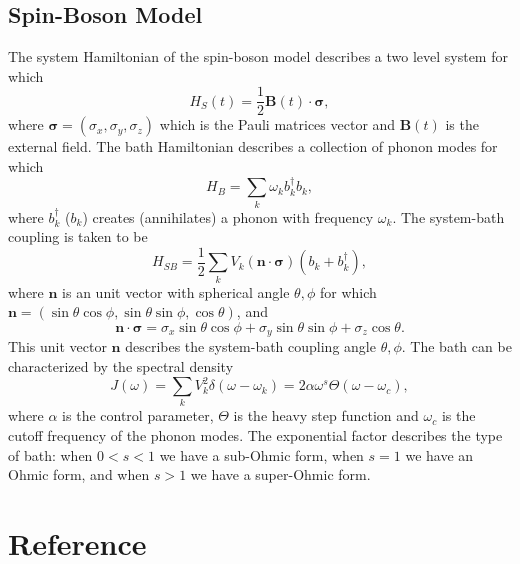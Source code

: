 \documentclass[11pt]{book}
\begin{document}
\section{Spin-Boson Model}
\label{sec:orgc525a9e}
The system Hamiltonian of the spin-boson model describes a two level
system for which
\begin{equation}
H_S(t)=\frac{1}{2}\bm{B}(t)\cdot\bm{\sigma},
\end{equation}
where \(\bm{\sigma}=(\sigma_x,\sigma_y,\sigma_z)\) which is the Pauli
matrices vector and \(\bm{B}(t)\) is the external field. The bath
Hamiltonian describes a collection of phonon modes for which
\begin{equation}
H_B=\sum_k\omega_kb_k^{\dag}b_k,
\end{equation}
where \(b_k^{\dag}\) (\(b_k\)) creates (annihilates) a phonon with
frequency \(\omega_k\). The system-bath coupling is taken to be
\begin{equation}
H_{SB}=\frac{1}{2}\sum_kV_k(\bm{n}\cdot\bm{\sigma})(b_k+b_k^{\dag}),
\end{equation}
where \(\bm{n}\) is an unit vector with spherical angle \(\theta,\phi\)
for which \(\bm{n}=(\sin\theta\cos\phi,\sin\theta\sin\phi,\cos\theta)\),
and
\begin{equation}
\bm{n}\cdot\bm{\sigma}=\sigma_x\sin\theta\cos\phi+
\sigma_y\sin\theta\sin\phi+\sigma_z\cos\theta.
\end{equation}
This unit vector \(\bm{n}\) describes the system-bath coupling angle
\(\theta,\phi\). The bath can be characterized by the spectral density
\begin{equation}
J(\omega)=\sum_kV_k^2\delta(\omega-\omega_k)=
2\alpha\omega^s\Theta(\omega-\omega_c),
\end{equation}
where \(\alpha\) is the control parameter, \(\Theta\) is the heavy step
function and \(\omega_c\) is the cutoff frequency of the phonon modes.
The exponential factor describes the type of bath: when \(0<s<1\) we
have a sub-Ohmic form, when \(s=1\) we have an Ohmic form, and when
\(s>1\) we have a super-Ohmic form.

\chapter{Reference}
\label{sec:org55a448b}


\end{document}
